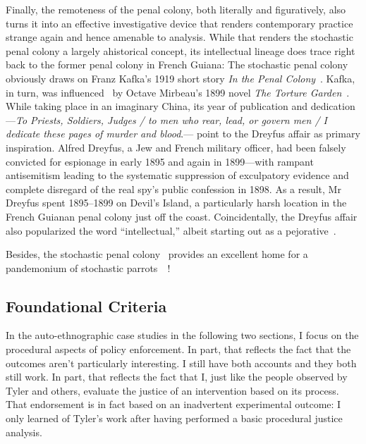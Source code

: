 Finally, the remoteness of the penal colony, both literally and figuratively,
also turns it into an effective investigative device that renders contemporary
practice strange again and hence amenable to analysis. While that renders the
stochastic penal colony a largely ahistorical concept, its intellectual lineage
does trace right back to the former penal colony in French Guiana: The
stochastic penal colony obviously draws on Franz Kafka's 1919 short story
\emph{In the Penal Colony}~\cite{Kafka1995}. Kafka, in turn, was
influenced~\cite{Robertson2017} by Octave Mirbeau's 1899 novel \emph{The Torture
Garden}~\cite{Mirbeau2008}. While taking place in an imaginary China, its year
of publication and dedication---\emph{To Priests, Soldiers, Judges / to men who
rear, lead, or govern men / I dedicate these pages of murder and blood}.---%
point to the Dreyfus affair as primary inspiration. Alfred Dreyfus, a Jew and
French military officer, had been falsely convicted for espionage in early 1895
and again in 1899---with rampant antisemitism leading to the systematic
suppression of exculpatory evidence and complete disregard of the real spy's
public confession in 1898. As a result, Mr Dreyfus spent 1895--1899 on Devil's
Island, a particularly harsh location in the French Guianan penal colony just
off the coast. Coincidentally, the Dreyfus affair also popularized the word
``intellectual,'' albeit starting out as a
pejorative~\cite{Drake2005,StudentsAtTheUniversityOfBristol2021}.

Besides, the stochastic penal colony~ provides an excellent
home for a pandemonium of stochastic
parrots~~\cite{BenderGebruea2021}!


\subsection{Foundational Criteria}
\label{sec:criteria}

In the auto-ethnographic case studies in the following two sections, I focus on
the procedural aspects of policy enforcement. In part, that reflects the fact
that the outcomes aren't particularly interesting. I still have both accounts
and they both still work. In part, that reflects the fact that I, just like the
people observed by Tyler and others, evaluate the justice of an intervention
based on its process. That endorsement is in fact based on an inadvertent
experimental outcome: I only learned of Tyler's work after having performed a
basic procedural justice analysis.

